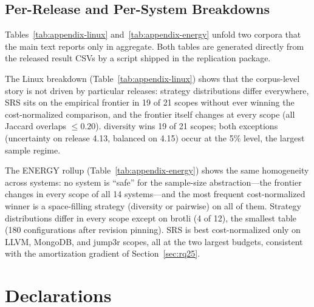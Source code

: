 \documentclass[smallcondensed]{svjour3}
\newcommand{\srs}{SRS\xspace}
\newcommand{\diShe}{\textsf{diversity}\xspace}
\newcommand{\pairwise}{\textsf{pairwise}\xspace}
\newcommand{\balanced}{\textsf{balanced}\xspace}
\begin{document}










\begin{appendix}
\section{Per-Release and Per-System Breakdowns}
\label{app:breakdowns}

Tables~\ref{tab:appendix-linux} and~\ref{tab:appendix-energy} unfold two
corpora that the main text reports only in aggregate. Both tables are
generated directly from the released result CSVs by a script shipped in
the replication package.

The Linux breakdown (Table~\ref{tab:appendix-linux}) shows that the
corpus-level story is not driven by particular releases: strategy
distributions differ everywhere, \srs{} sits on the empirical frontier in
19 of 21 scopes without ever winning the cost-normalized comparison, and
the frontier itself changes at every scope (all Jaccard overlaps
$\le 0.20$). \diShe{} wins 19 of 21 scopes; both exceptions
(\textsf{uncertainty} on release 4.13, \balanced{} on 4.15) occur at the
5\% level, the largest sample regime.

The ENERGY rollup (Table~\ref{tab:appendix-energy}) shows the same
homogeneity across systems: no system is ``safe'' for the sample-size
abstraction---the frontier changes in every scope of all 14 systems---and
the most frequent cost-normalized winner is a space-filling strategy
(\diShe{} or \pairwise) on all of them. Strategy distributions differ in
every scope except on brotli (4 of 12), the smallest table (180
configurations after revision pinning). \srs{} is best cost-normalized
only on LLVM, MongoDB, and jump3r scopes, all at the two largest budgets,
consistent with the amortization gradient of Section~\ref{sec:rq25}.



\end{appendix}

\begin{acknowledgements}
\end{acknowledgements}

\section*{Declarations}
\end{document}
